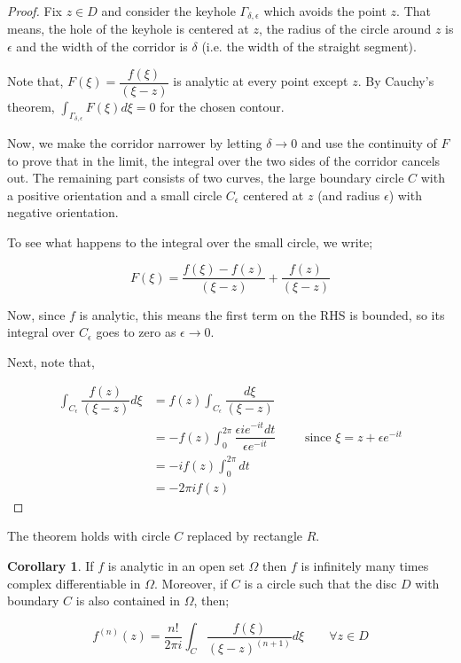 \documentclass[12pt]{article}
\theoremstyle{definition}
\newtheorem{cor}{Corollary}
\newenvironment{remark}{
\begin{tcolorbox}[colback=blue!5!white,colframe=blue!75!black,title=Remark, parbox = false] }{\end{tcolorbox} }
\newenvironment{corollary}{
\begin{tcolorbox}[colback=blue!5!white,colframe=blue!75!black, parbox = false]\begin{cor} }{\end{cor}\end{tcolorbox} }
\begin{document}
\begin{proof}
    Fix $z \in D$ and consider the keyhole $\Gamma_{\delta, \epsilon}$ which avoids the point $z$. That means, the hole of the keyhole is centered at $z$, the radius of the circle around $z$ is $\epsilon$ and the width of the corridor is $\delta$ (i.e. the width of the straight segment).

    Note that, $F(\xi) = \dfrac{f(\xi)}{(\xi - z)}$ is analytic at every point except $z$. By Cauchy's theorem, $\int_{\Gamma_{\delta, \epsilon}} F(\xi)d\xi = 0$ for the chosen contour.

    Now, we make the corridor narrower by letting $\delta \rightarrow 0$ and use the continuity of $F$ to prove that in the limit, the integral over the two sides of the corridor cancels out. The remaining part consists of two curves, the large boundary circle $C$ with a positive orientation and a small circle $C_{\epsilon}$ centered at $z$ (and radius $\epsilon$) with negative orientation.

    To see what happens to the integral over the small circle, we write;

    $$F(\xi) = \dfrac{f(\xi) - f(z)}{(\xi - z)} + \dfrac{f(z)}{(\xi - z)}$$

    Now, since $f$ is analytic, this means the first term on the RHS is bounded, so its integral over $C_\epsilon$ goes to zero as $\epsilon \rightarrow 0$.

    Next, note that,

    \begin{align*}
        \int_{C_\epsilon} \dfrac{f(z)}{(\xi - z)} d\xi 
        & = f(z) \int_{C_\epsilon} \dfrac{d\xi}{(\xi - z)}\\
        & = - f(z) \int_{0}^{2\pi} \dfrac{\epsilon i e^{-it} dt}{\epsilon e^{-it}} \qquad \text{ since } \xi = z + \epsilon e^{-it}\\
        & = - if(z) \int_{0}^{2\pi} dt\\
        & = -2\pi i f(z)
    \end{align*}
\end{proof}

\begin{remark}
    The theorem holds with circle $C$ replaced by rectangle $R$.
\end{remark}

\begin{corollary}
    If $f$ is analytic in an open set $\Omega$ then $f$ is infinitely many times complex differentiable in $\Omega$. Moreover, if $C$ is a circle such that the disc $D$ with boundary $C$ is also contained in $\Omega$, then;

    $$f^{(n)}(z) = \dfrac{n!}{2\pi i} \int_{C} \dfrac{f(\xi)}{(\xi - z)^{(n+1)}} d\xi \qquad \forall z \in D$$
\end{corollary}
\end{document}
